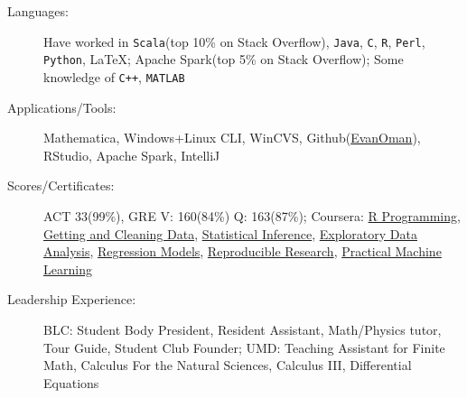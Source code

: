 \documentclass[letterpaper,10pt]{article}
\begin{document}
		\begin{description}
			\item[Languages:]
				Have worked in \verb!Scala!(top 10\% on Stack Overflow), \verb!Java!, \verb!C!, \verb!R!, \verb!Perl!, \verb!Python!, \LaTeX; Apache Spark(top 5\% on Stack Overflow); Some knowledge of \verb!C++!, \verb!MATLAB!
			\item[Applications/Tools:]
			Mathematica, Windows+Linux CLI, WinCVS, Github(\href{https://www.github.com/EvanOman}{EvanOman}), RStudio, Apache Spark, IntelliJ

			\item[Scores/Certificates:]
			ACT 33(99\%), GRE V: 160(84\%) Q: 163(87\%); Coursera: \href{https://www.coursera.org/account/accomplishments/records/cxq3vN5HB76be56t}{R Programming}, \href{https://www.coursera.org/account/accomplishments/records/Xt3sCA24Qz3Par7M}{Getting and Cleaning Data}, \href{https://www.coursera.org/account/accomplishments/records/yPex7nURcXCYdsse}{Statistical Inference}, \href{https://www.coursera.org/account/accomplishments/records/XMkgJcmHPGtNBXsU}{Exploratory Data Analysis}, \href{https://www.coursera.org/account/accomplishments/records/Qx8qaDCvw9ZNQtqP}{Regression Models}, \href{https://www.coursera.org/account/accomplishments/records/g5LfcvAD5rJuEnGX}{Reproducible Research},
			\href{https://www.coursera.org/account/accomplishments/verify/ZNTJVMJKSH}{Practical Machine Learning}

			\item[Leadership Experience:]
			BLC: Student Body President, Resident Assistant, Math/Physics tutor, Tour Guide, Student Club Founder; UMD: Teaching Assistant for Finite Math, Calculus For the Natural Sciences, Calculus III, Differential Equations
		\end{description}
\end{document}
